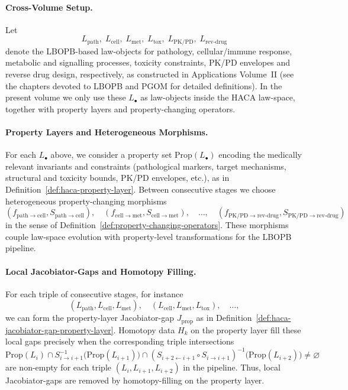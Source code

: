 \documentclass[11pt]{book}
\theoremstyle{plain}
\theoremstyle{definition}
\theoremstyle{remark}
\begin{document}
\paragraph{Cross-Volume Setup.}
Let
\[
  L_{\mathrm{path}},\;
  L_{\mathrm{cell}},\;
  L_{\mathrm{met}},\;
  L_{\mathrm{tox}},\;
  L_{\mathrm{PK/PD}},\;
  L_{\mathrm{rev\mbox{-}drug}}
\]
denote the LBOPB-based law-objects for pathology, cellular/immune response,
metabolic and signalling processes, toxicity constraints, PK/PD envelopes
and reverse drug design, respectively, as constructed in Applications
Volume~II (see the chapters devoted to LBOPB and PGOM for detailed
definitions). In the present volume we only use these $L_{\bullet}$ as
law-objects inside the HACA law-space, together with property layers
and property-changing operators.

\paragraph{Property Layers and Heterogeneous Morphisms.}
For each $L_\bullet$ above, we consider a property set
$\mathrm{Prop}(L_\bullet)$ encoding the medically relevant invariants and
constraints (pathological markers, target mechanisms, structural and
toxicity bounds, PK/PD envelopes, etc.), as in
Definition~\ref{def:haca-property-layer}. Between consecutive stages we
choose heterogeneous property-changing morphisms
\[
  (f_{\mathrm{path}\to\mathrm{cell}}, S_{\mathrm{path}\to\mathrm{cell}}),
  \quad
  (f_{\mathrm{cell}\to\mathrm{met}}, S_{\mathrm{cell}\to\mathrm{met}}),
  \quad
  \dots,
  \quad
  (f_{\mathrm{PK/PD}\to\mathrm{rev\mbox{-}drug}},
   S_{\mathrm{PK/PD}\to\mathrm{rev\mbox{-}drug}})
\]
in the sense of Definition~\ref{def:property-changing-operators}. These
morphisms couple law-space evolution with property-level transformations
for the LBOPB pipeline.

\paragraph{Local Jacobiator-Gaps and Homotopy Filling.}
For each triple of consecutive stages, for instance
\[
  (L_{\mathrm{path}},L_{\mathrm{cell}},L_{\mathrm{met}}),
  \quad
  (L_{\mathrm{cell}},L_{\mathrm{met}},L_{\mathrm{tox}}),
  \quad
  \dots,
\]
we can form the property-layer Jacobiator-gap
$J_{\mathrm{prop}}$ as in
Definition~\ref{def:haca-jacobiator-gap-property-layer}. Homotopy data
$H_k$ on the property layer fill these local gaps precisely when the
corresponding triple intersections
\[
  \mathrm{Prop}(L_i)
  \cap S_{i\to i+1}^{-1}\bigl(\mathrm{Prop}(L_{i+1})\bigr)
  \cap (S_{i+2\leftarrow i+1}\circ S_{i\to i+1})^{-1}
       \bigl(\mathrm{Prop}(L_{i+2})\bigr)
  \neq \varnothing
\]
are non-empty for each triple $(L_i,L_{i+1},L_{i+2})$ in the pipeline.
Thus, local Jacobiator-gaps are removed by homotopy-filling on the property
layer.
\end{document}
